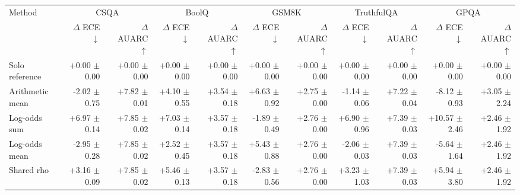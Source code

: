 \begin{tabular}{lrrrrrrrrrr}
\toprule
Method & \multicolumn{2}{c}{CSQA} & \multicolumn{2}{c}{BoolQ} & \multicolumn{2}{c}{GSM8K} & \multicolumn{2}{c}{TruthfulQA} & \multicolumn{2}{c}{GPQA} \\
 & $\Delta$ ECE $\downarrow$ & $\Delta$ AUARC $\uparrow$ & $\Delta$ ECE $\downarrow$ & $\Delta$ AUARC $\uparrow$ & $\Delta$ ECE $\downarrow$ & $\Delta$ AUARC $\uparrow$ & $\Delta$ ECE $\downarrow$ & $\Delta$ AUARC $\uparrow$ & $\Delta$ ECE $\downarrow$ & $\Delta$ AUARC $\uparrow$ \\
\midrule
Solo reference & +0.00 {\scriptsize $\pm$ 0.00} & +0.00 {\scriptsize $\pm$ 0.00} & +0.00 {\scriptsize $\pm$ 0.00} & +0.00 {\scriptsize $\pm$ 0.00} & +0.00 {\scriptsize $\pm$ 0.00} & +0.00 {\scriptsize $\pm$ 0.00} & +0.00 {\scriptsize $\pm$ 0.00} & +0.00 {\scriptsize $\pm$ 0.00} & +0.00 {\scriptsize $\pm$ 0.00} & +0.00 {\scriptsize $\pm$ 0.00} \\
Arithmetic mean & -2.02 {\scriptsize $\pm$ 0.75} & +7.82 {\scriptsize $\pm$ 0.01} & +4.10 {\scriptsize $\pm$ 0.55} & +3.54 {\scriptsize $\pm$ 0.18} & +6.63 {\scriptsize $\pm$ 0.92} & +2.75 {\scriptsize $\pm$ 0.00} & -1.14 {\scriptsize $\pm$ 0.06} & +7.22 {\scriptsize $\pm$ 0.04} & -8.12 {\scriptsize $\pm$ 0.93} & +3.05 {\scriptsize $\pm$ 2.24} \\
Log-odds sum & +6.97 {\scriptsize $\pm$ 0.14} & +7.85 {\scriptsize $\pm$ 0.02} & +7.03 {\scriptsize $\pm$ 0.14} & +3.57 {\scriptsize $\pm$ 0.18} & -1.89 {\scriptsize $\pm$ 0.49} & +2.76 {\scriptsize $\pm$ 0.00} & +6.90 {\scriptsize $\pm$ 0.96} & +7.39 {\scriptsize $\pm$ 0.03} & +10.57 {\scriptsize $\pm$ 2.46} & +2.46 {\scriptsize $\pm$ 1.92} \\
Log-odds mean & -2.95 {\scriptsize $\pm$ 0.28} & +7.85 {\scriptsize $\pm$ 0.02} & +2.52 {\scriptsize $\pm$ 0.45} & +3.57 {\scriptsize $\pm$ 0.18} & +5.43 {\scriptsize $\pm$ 0.88} & +2.76 {\scriptsize $\pm$ 0.00} & -2.06 {\scriptsize $\pm$ 0.03} & +7.39 {\scriptsize $\pm$ 0.03} & -5.64 {\scriptsize $\pm$ 1.64} & +2.46 {\scriptsize $\pm$ 1.92} \\
Shared rho & +3.16 {\scriptsize $\pm$ 0.09} & +7.85 {\scriptsize $\pm$ 0.02} & +5.46 {\scriptsize $\pm$ 0.13} & +3.57 {\scriptsize $\pm$ 0.18} & -2.83 {\scriptsize $\pm$ 0.56} & +2.76 {\scriptsize $\pm$ 0.00} & +3.23 {\scriptsize $\pm$ 1.03} & +7.39 {\scriptsize $\pm$ 0.03} & +5.94 {\scriptsize $\pm$ 3.80} & +2.46 {\scriptsize $\pm$ 1.92} \\

\end{tabular}
